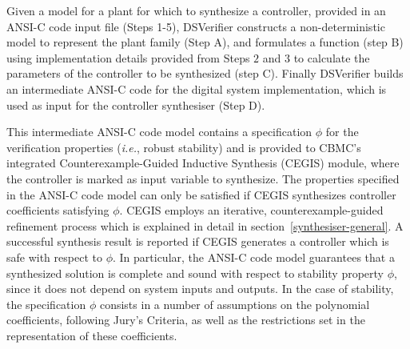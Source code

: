 \documentclass{sig-alternate-05-2015}
\begin{document}

Given a model for a plant for which to synthesize a controller,
provided in an ANSI-C code input file (Steps 1-5), DSVerifier constructs a
non-deterministic model to represent the plant family (Step A), and formulates a 
function (step B) using implementation details provided from Steps $2$ and $3$ 
to calculate the parameters of the controller to be synthesized (step C).  
Finally DSVerifier builds an intermediate ANSI-C code for the digital system 
implementation, which is used as input for the controller synthesiser (Step D).

This intermediate ANSI-C code model contains a specification $\phi$ for the
verification properties ({\it i.e.}, robust stability) and is provided to
CBMC's~\cite{ClarkeKL04} integrated Counterexample-Guided Inductive Synthesis
(CEGIS) module, where the controller is marked as input variable to synthesize.
The properties specified in the ANSI-C code model can only be satisfied if CEGIS
synthesizes controller coefficients satisfying $\phi$. CEGIS employs an iterative,
counterexample-guided refinement process which is explained in detail in
section~\ref{synthesiser-general}. A successful synthesis result is reported if
CEGIS generates a controller which is safe with respect to $\phi$.  In particular,
the ANSI-C code model guarantees that a synthesized solution is complete
and sound with respect to stability property $\phi$, since it does not depend on
system inputs and outputs.  In the case of stability, the specification $\phi$
consists in a number of assumptions on the polynomial coefficients, following
Jury's Criteria, as well as the restrictions set in the representation of these
coefficients.

\end{document}
